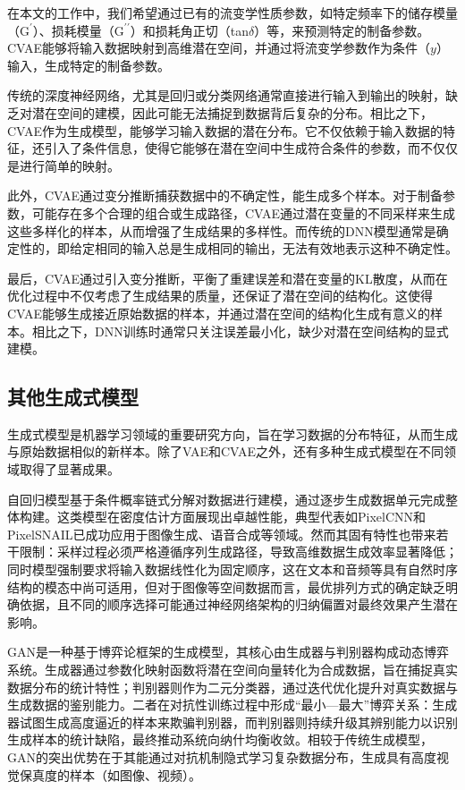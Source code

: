 在本文的工作中，我们希望通过已有的流变学性质参数，如特定频率下的储存模量（$\mathrm{G^{\prime}}$）、损耗模量（$\mathrm{G^{\prime\prime}}$）和损耗角正切（tan$\delta$）等，来预测特定的制备参数。CVAE能够将输入数据映射到高维潜在空间，并通过将流变学参数作为条件（$y$）输入，生成特定的制备参数。

传统的深度神经网络，尤其是回归或分类网络通常直接进行输入到输出的映射，缺乏对潜在空间的建模，因此可能无法捕捉到数据背后复杂的分布。相比之下，CVAE作为生成模型，能够学习输入数据的潜在分布。它不仅依赖于输入数据的特征，还引入了条件信息，使得它能够在潜在空间中生成符合条件的参数，而不仅仅是进行简单的映射。

此外，CVAE通过变分推断捕获数据中的不确定性，能生成多个样本。对于制备参数，可能存在多个合理的组合或生成路径，CVAE通过潜在变量的不同采样来生成这些多样化的样本，从而增强了生成结果的多样性。而传统的DNN模型通常是确定性的，即给定相同的输入总是生成相同的输出，无法有效地表示这种不确定性。

最后，CVAE通过引入变分推断，平衡了重建误差和潜在变量的KL散度，从而在优化过程中不仅考虑了生成结果的质量，还保证了潜在空间的结构化。这使得CVAE能够生成接近原始数据的样本，并通过潜在空间的结构化生成有意义的样本。相比之下，DNN训练时通常只关注误差最小化，缺少对潜在空间结构的显式建模。
\subsection{其他生成式模型}
生成式模型是机器学习领域的重要研究方向，旨在学习数据的分布特征，从而生成与原始数据相似的新样本。除了VAE和CVAE之外，还有多种生成式模型在不同领域取得了显著成果。

自回归模型基于条件概率链式分解对数据进行建模，通过逐步生成数据单元完成整体构建\cite{bengio2003adaptive}。这类模型在密度估计方面展现出卓越性能，典型代表如PixelCNN和PixelSNAIL已成功应用于图像生成、语音合成等领域。然而其固有特性也带来若干限制：采样过程必须严格遵循序列生成路径，导致高维数据生成效率显著降低；同时模型强制要求将输入数据线性化为固定顺序，这在文本和音频等具有自然时序结构的模态中尚可适用，但对于图像等空间数据而言，最优排列方式的确定缺乏明确依据，且不同的顺序选择可能通过神经网络架构的归纳偏置对最终效果产生潜在影响\cite{bondtaylor2022deep}。

GAN是一种基于博弈论框架的生成模型，其核心由生成器与判别器构成动态博弈系统\cite{NIPS2014_5ca3e9b1}。生成器通过参数化映射函数将潜在空间向量转化为合成数据，旨在捕捉真实数据分布的统计特性；判别器则作为二元分类器，通过迭代优化提升对真实数据与生成数据的鉴别能力。二者在对抗性训练过程中形成“最小---最大”博弈关系：生成器试图生成高度逼近的样本来欺骗判别器，而判别器则持续升级其辨别能力以识别生成样本的统计缺陷，最终推动系统向纳什均衡收敛。相较于传统生成模型，GAN的突出优势在于其能通过对抗机制隐式学习复杂数据分布，生成具有高度视觉保真度的样本（如图像、视频）\cite{Goodfellow2020Generative}。

